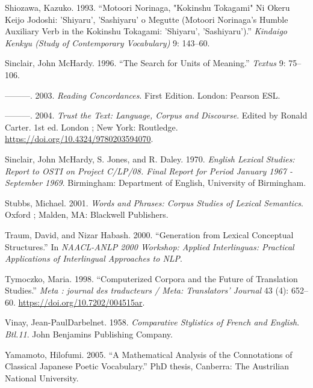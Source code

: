 \documentclass[
  letterpaper,
  DIV=11,
  numbers=noendperiod]{scrartcl}
\newlength{\cslhangindent}
\newenvironment{CSLReferences}[2] %
 {\begin{list}{}{%
  \setlength{\itemindent}{0pt}
  \setlength{\leftmargin}{0pt}
  \setlength{\parsep}{0pt}
  \ifodd #1
   \setlength{\leftmargin}{\cslhangindent}
   \setlength{\itemindent}{-1\cslhangindent}
  \fi
  \setlength{\itemsep}{#2\baselineskip}}}
 {\end{list}}
\begin{document}
\begin{CSLReferences}{1}{0}
Shiozawa, Kazuko. 1993. {``Motoori {Norinaga}, "{Kokinshu Tokagami}" Ni
Okeru Keijo Jodoshi: 'Shiyaru', 'Sashiyaru' o Megutte ({Motoori
Norinaga}'s Humble Auxiliary Verb in the {Kokinshu Tokagami}: 'Shiyaru',
'Sashiyaru').''} \emph{Kindaigo Kenkyu (Study of Contemporary
Vocabulary)} 9: 143--60.

Sinclair, John McHardy. 1996. {``The {Search} for {Units} of
{Meaning}.''} \emph{Textus} 9: 75--106.

---------. 2003. \emph{Reading {Concordances}}. First Edition. London:
Pearson ESL.

---------. 2004. \emph{Trust the {Text}: {Language}, {Corpus} and
{Discourse}}. Edited by Ronald Carter. 1st ed. London ; New York:
Routledge. \url{https://doi.org/10.4324/9780203594070}.

Sinclair, John McHardy, S. Jones, and R. Daley. 1970. \emph{English
Lexical Studies: Report to {OSTI} on Project {C}/{LP}/08. {Final} Report
for Period {January} 1967 - {September} 1969}. Birmingham: Department of
English, University of Birmingham.

Stubbs, Michael. 2001. \emph{Words and Phrases: Corpus Studies of
Lexical Semantics}. Oxford ; Malden, MA: Blackwell Publishers.

Traum, David, and Nizar Habash. 2000. {``Generation from {Lexical
Conceptual Structures}.''} In \emph{{NAACL-ANLP} 2000 {Workshop}:
{Applied Interlinguas}: {Practical Applications} of {Interlingual
Approaches} to {NLP}}.

Tymoczko, Maria. 1998. {``{Computerized Corpora and the Future of
Translation Studies}.''} \emph{Meta : journal des traducteurs / Meta:
Translators' Journal} 43 (4): 652--60.
\url{https://doi.org/10.7202/004515ar}.

Vinay, Jean-PaulDarbelnet. 1958. \emph{Comparative {Stylistics} of
{French} and {English}}. \emph{Btl.11}. John Benjamins Publishing
Company.

Yamamoto, Hilofumi. 2005. {``A Mathematical Analysis of the Connotations
of Classical {Japanese} Poetic Vocabulary.''} PhD thesis, Canberra: The
Austrilian National University.


\end{CSLReferences}
\end{document}

